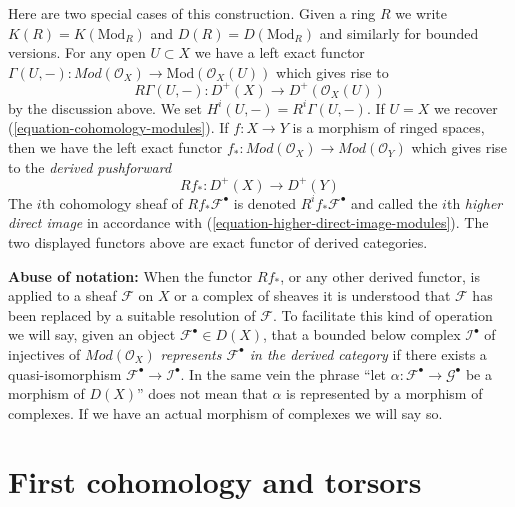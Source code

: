 \medskip\noindent
Here are two special cases of this construction.
Given a ring $R$ we write $K(R) = K(\text{Mod}_R)$ and
$D(R) = D(\text{Mod}_R)$ and similarly for bounded versions.
For any open $U \subset X$ we have a left exact functor
$
\Gamma(U, -) :
\textit{Mod}(\mathcal{O}_X)
\longrightarrow
\text{Mod}(\mathcal{O}_X(U))
$
which gives rise to
\begin{equation}
\label{equation-total-derived-cohomology}
R\Gamma(U, -) :
D^{+}(X)
\longrightarrow
D^{+}(\mathcal{O}_X(U))
\end{equation}
by the discussion above. We set $H^i(U, -) = R^i\Gamma(U, -)$.
If $U = X$ we recover (\ref{equation-cohomology-modules}).
If $f : X \to Y$ is a morphism of ringed spaces, then we have
the left exact functor
$
f_* :
\textit{Mod}(\mathcal{O}_X)
\longrightarrow
\textit{Mod}(\mathcal{O}_Y)
$
which gives rise to the {\it derived pushforward}
\begin{equation}
\label{equation-total-derived-direct-image}
Rf_* :
D^{+}(X)
\longrightarrow
D^{+}(Y)
\end{equation}
The $i$th cohomology sheaf of $Rf_*\mathcal{F}^\bullet$ is denoted
$R^if_*\mathcal{F}^\bullet$ and called the $i$th {\it higher direct image}
in accordance with (\ref{equation-higher-direct-image-modules}).
The two displayed functors above are exact functor
of derived categories.

\medskip\noindent
{\bf Abuse of notation:} When the functor $Rf_*$, or any other
derived functor, is applied to a sheaf $\mathcal{F}$ on $X$ or a complex
of sheaves it is understood that $\mathcal{F}$ has been replaced by a
suitable resolution of $\mathcal{F}$. To facilitate this kind of
operation we will say, given an object $\mathcal{F}^\bullet \in D(X)$,
that a bounded below complex $\mathcal{I}^\bullet$ of injectives of
$\textit{Mod}(\mathcal{O}_X)$
{\it represents $\mathcal{F}^\bullet$ in the derived category}
if there exists a quasi-isomorphism
$\mathcal{F}^\bullet \to \mathcal{I}^\bullet$. In the same vein the phrase
``let $\alpha : \mathcal{F}^\bullet \to \mathcal{G}^\bullet$ be
a morphism of $D(X)$'' does not mean that $\alpha$ is represented by a
morphism of complexes. If we have an actual morphism of complexes we will
say so.









\section{First cohomology and torsors}
\label{section-h1-torsors}

